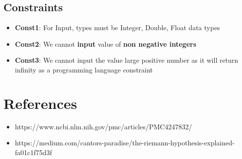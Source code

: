 \documentclass{article}
\begin{document}
\subsection{Constraints}
\begin{itemize}
\item \textbf{Const1}: For Input, types must be Integer, Double, Float data types
\item \textbf{Const2}: We cannot \textbf{input} value of \textbf{non negative integers}
\item \textbf{Const3}: We cannot input the value large positive number as it will return infinity as a programming language constraint
\end{itemize}

\section{References}
\begin{itemize}
\item https://www.ncbi.nlm.nih.gov/pmc/articles/PMC4247832/
\item https://medium.com/cantors-paradise/the-riemann-hypothesis-explained-fa01c1f75d3f
\end{itemize}
\end{document}
